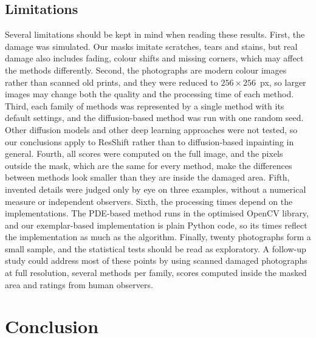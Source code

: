 \documentclass[conference]{IEEEtran}
\begin{document}
\subsection*{Limitations}

Several limitations should be kept in mind when reading these results. First, the damage was simulated. Our masks imitate scratches, tears and stains, but real damage also includes fading, colour shifts and missing corners, which may affect the methods differently. Second, the photographs are modern colour images rather than scanned old prints, and they were reduced to $256 \times 256$~px, so larger images may change both the quality and the processing time of each method. Third, each family of methods was represented by a single method with its default settings, and the diffusion-based method was run with one random seed. Other diffusion models and other deep learning approaches were not tested, so our conclusions apply to ResShift rather than to diffusion-based inpainting in general. Fourth, all scores were computed on the full image, and the pixels outside the mask, which are the same for every method, make the differences between methods look smaller than they are inside the damaged area. Fifth, invented details were judged only by eye on three examples, without a numerical measure or independent observers. Sixth, the processing times depend on the implementations. The PDE-based method runs in the optimised OpenCV library, and our exemplar-based implementation is plain Python code, so its times reflect the implementation as much as the algorithm. Finally, twenty photographs form a small sample, and the statistical tests should be read as exploratory. A follow-up study could address most of these points by using scanned damaged photographs at full resolution, several methods per family, scores computed inside the masked area and ratings from human observers.

\section{Conclusion}
\label{sec:conclusion}
\end{document}
